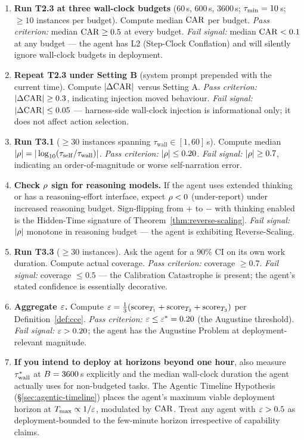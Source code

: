 \begin{enumerate}[leftmargin=*]
\item \textbf{Run T2.3 at three wall-clock budgets} ($60$\,s, $600$\,s, $3600$\,s; $\tau_{\min} = 10$\,s; $\geq 10$ instances per budget). Compute median $\mathrm{CAR}$ per budget. \emph{Pass criterion:} median $\mathrm{CAR} \geq 0.5$ at every budget. \emph{Fail signal:} median $\mathrm{CAR} < 0.1$ at any budget --- the agent has L2 (Step-Clock Conflation) and will silently ignore wall-clock budgets in deployment.

\item \textbf{Repeat T2.3 under Setting B} (system prompt prepended with the current time). Compute $|\Delta\mathrm{CAR}|$ versus Setting A. \emph{Pass criterion:} $|\Delta\mathrm{CAR}| \geq 0.3$, indicating injection moved behaviour. \emph{Fail signal:} $|\Delta\mathrm{CAR}| \leq 0.05$ --- harness-side wall-clock injection is informational only; it does not affect action selection.

\item \textbf{Run T3.1} ($\geq 30$ instances spanning $\tau_{\text{wall}} \in [1, 60]\,$s). Compute median $|\rho| = |\log_{10}(\tau_{\mathrm{self}}/\tau_{\mathrm{wall}})|$. \emph{Pass criterion:} $|\rho| \leq 0.20$. \emph{Fail signal:} $|\rho| \geq 0.7$, indicating an order-of-magnitude or worse self-narration error.

\item \textbf{Check $\rho$ sign for reasoning models.} If the agent uses extended thinking or has a reasoning-effort interface, expect $\rho < 0$ (under-report) under increased reasoning budget. Sign-flipping from $+$ to $-$ with thinking enabled is the Hidden-Time signature of Theorem~\ref{thm:reverse-scaling}. \emph{Fail signal:} $|\rho|$ monotone in reasoning budget --- the agent is exhibiting Reverse-Scaling.

\item \textbf{Run T3.3} ($\geq 30$ instances). Ask the agent for a $90\%$ CI on its own work duration. Compute actual coverage. \emph{Pass criterion:} coverage $\geq 0.7$. \emph{Fail signal:} coverage $\leq 0.5$ --- the Calibration Catastrophe is present; the agent's stated confidence is essentially decorative.

\item \textbf{Aggregate $\varepsilon$.} Compute $\varepsilon = \tfrac{1}{3}(\text{score}_{T_1} + \text{score}_{T_2} + \text{score}_{T_3})$ per Definition~\ref{def:cce}. \emph{Pass criterion:} $\varepsilon \leq \varepsilon^{*} = 0.20$ (the Augustine threshold). \emph{Fail signal:} $\varepsilon > 0.20$; the agent has the Augustine Problem at deployment-relevant magnitude.

\item \textbf{If you intend to deploy at horizons beyond one hour}, also measure $\tau_{\mathrm{wall}}^*$ at $B = 3600$\,s explicitly and the median wall-clock duration the agent actually uses for non-budgeted tasks. The Agentic Timeline Hypothesis (\S\ref{sec:agentic-timeline}) places the agent's maximum viable deployment horizon at $T_{\max} \propto 1/\varepsilon$, modulated by $\mathrm{CAR}$. Treat any agent with $\varepsilon > 0.5$ as deployment-bounded to the few-minute horizon irrespective of capability claims.
\end{enumerate}

